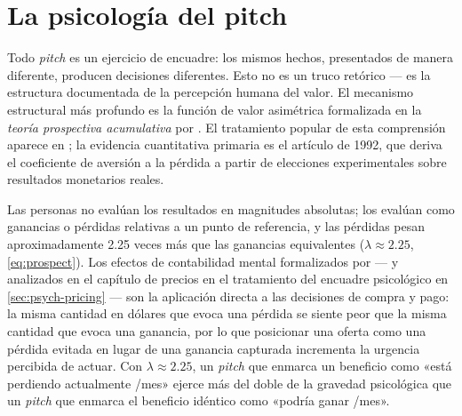 \section{La psicología del pitch}\label{sec:pitch-psychology}

Todo \emph{pitch} es un ejercicio de encuadre: los mismos hechos, presentados de manera
diferente, producen decisiones diferentes. Esto no es un truco retórico --- es la estructura
documentada de la percepción humana del valor. El mecanismo estructural más profundo es la
función de valor asimétrica formalizada en la \emph{teoría prospectiva acumulativa} por
\textcite{tversky1992cumulative}. El tratamiento popular de esta comprensión aparece en
\textcite{kahneman2011}; la evidencia cuantitativa primaria es el artículo de 1992, que deriva
el coeficiente de aversión a la pérdida a partir de elecciones experimentales sobre resultados
monetarios reales.

Las personas no evalúan los resultados en magnitudes absolutas; los evalúan como ganancias o
pérdidas relativas a un punto de referencia, y las pérdidas pesan aproximadamente \num{2.25}
veces más que las ganancias equivalentes ($\lambda \approx 2.25$, \cref{eq:prospect}).
Los efectos de contabilidad mental formalizados por \textcite{thaler1985mental} --- y analizados
en el capítulo de precios en el tratamiento del encuadre psicológico en \cref{sec:psych-pricing}
--- son la aplicación directa a las decisiones de compra y pago: la misma cantidad en dólares
que evoca una pérdida se siente peor que la misma cantidad que evoca una ganancia, por lo que
posicionar una oferta como una pérdida evitada en lugar de una ganancia capturada incrementa
la urgencia percibida de actuar. Con $\lambda \approx 2.25$, un \emph{pitch} que enmarca un
beneficio como «está perdiendo actualmente /mes» ejerce más del doble de la gravedad
psicológica que un \emph{pitch} que enmarca el beneficio idéntico como «podría ganar
/mes».

